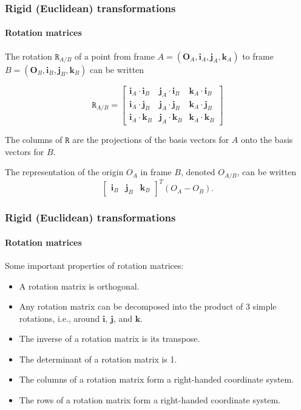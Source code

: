 \documentclass[aspectratio=169]{beamer}
\renewcommand{\vec}[1]{\boldsymbol{#1}}
\newcommand{\mat}[1]{\mathtt{#1}}
\begin{document}
\begin{frame}
\frametitle{Rigid (Euclidean) transformations}
\framesubtitle{Rotation matrices}

The rotation $\mat{R}_{A/B}$ of a point from frame $A =
(\vec{O}_A,\vec{i}_A,\vec{j}_A,\vec{k}_A)$ to frame $B =
(\vec{O}_B,\vec{i}_B,\vec{j}_B,\vec{k}_B)$ can be written

\begin{equation}
\mat{R}_{A/B} = \begin{bmatrix}
\vec{i}_A \cdot \vec{i}_B &
\vec{j}_A \cdot \vec{i}_B &
\vec{k}_A \cdot \vec{i}_B \\
\vec{i}_A \cdot \vec{j}_B &
\vec{j}_A \cdot \vec{j}_B &
\vec{k}_A \cdot \vec{j}_B \\
\vec{i}_A \cdot \vec{k}_B &
\vec{j}_A \cdot \vec{k}_B &
\vec{k}_A \cdot \vec{k}_B
\end{bmatrix}
\end{equation}

The \alert{columns} of $\mat{R}$ are the projections of the basis
vectors for $A$ onto the basis vectors for $B$.

\medskip

The representation of the origin $O_A$ in frame $B$, denoted $O_{A/B}$,
can be written
\[ \begin{bmatrix} \vec{i}_B & \vec{j}_B & \vec{k}_B \end{bmatrix}^T (O_A-O_B). \]


\end{frame}

\begin{frame}
\frametitle{Rigid (Euclidean) transformations}
\framesubtitle{Rotation matrices}

Some important properties of rotation matrices:
\begin{itemize}
\item A rotation matrix is \alert{orthogonal}.
\item Any rotation matrix can be decomposed into the \alert{product of
  3 simple rotations}, i.e., around $\vec{i}$, $\vec{j}$, and
  $\vec{k}$.
\item The \alert{inverse} of a rotation matrix is its
  \alert{transpose}.
\item The \alert{determinant} of a rotation matrix is 1.
\item The \alert{columns} of a rotation matrix form a right-handed
  coordinate system.
\item The \alert{rows} of a rotation matrix form a right-handed
  coordinate system.
\end{itemize}

\end{frame}
\end{document}
